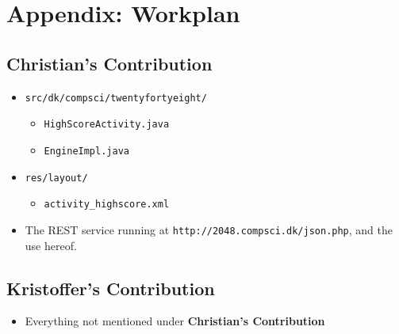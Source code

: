 \documentclass[a4paper, 12pt]{article}
\newcommand{\code}[1]{\texttt{#1}}
\begin{document}
\newpage
\appendix
\section{Appendix: Workplan}
\subsection{Christian's Contribution}
\begin{itemize}
\item \code{src/dk/compsci/twentyfortyeight/}
  \begin{itemize}
  \item \code{HighScoreActivity.java}
  \item \code{EngineImpl.java}
  \end{itemize}
\item \code{res/layout/}
  \begin{itemize}
  \item \code{activity\_highscore.xml}
  \end{itemize}
\item The REST service running at \code{http://2048.compsci.dk/json.php}, and the use hereof.
\end{itemize}
\subsection{Kristoffer's Contribution}
\begin{itemize}
\item Everything not mentioned under \textbf{Christian's Contribution}
\end{itemize}
\end{document}

